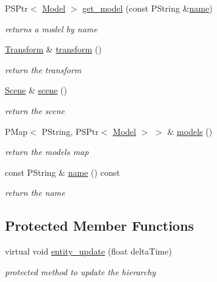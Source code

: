 \begin{DoxyCompactItemize}
P\+S\+Ptr$<$ \mbox{\hyperlink{classprz_1_1_model}{Model}} $>$ \mbox{\hyperlink{classprz_1_1_entity_a9596c8a874c25cb930360b4dacaf7188}{get\+\_\+model}} (const P\+String \&\mbox{\hyperlink{classprz_1_1_entity_a3dcb8ce07126711bf90f3272b293d980}{name}})
\begin{DoxyCompactList}\small\item\em returns a model by name \end{DoxyCompactList}\item 
\mbox{\hyperlink{classprz_1_1_transform}{Transform}} \& \mbox{\hyperlink{classprz_1_1_entity_a4ad46e0479f2aa68a0ec75c8fe3b8238}{transform}} ()
\begin{DoxyCompactList}\small\item\em return the transform \end{DoxyCompactList}\item 
\mbox{\hyperlink{classprz_1_1_scene}{Scene}} \& \mbox{\hyperlink{classprz_1_1_entity_abc93c872fbda2dff6c205a8aeac9d96e}{scene}} ()
\begin{DoxyCompactList}\small\item\em return the scene \end{DoxyCompactList}\item 
P\+Map$<$ P\+String, P\+S\+Ptr$<$ \mbox{\hyperlink{classprz_1_1_model}{Model}} $>$ $>$ \& \mbox{\hyperlink{classprz_1_1_entity_af6c594463d2a6cb91d1e30b7d5bda397}{models}} ()
\begin{DoxyCompactList}\small\item\em return the models map \end{DoxyCompactList}\item 
const P\+String \& \mbox{\hyperlink{classprz_1_1_entity_a3dcb8ce07126711bf90f3272b293d980}{name}} () const
\begin{DoxyCompactList}\small\item\em return the name \end{DoxyCompactList}\end{DoxyCompactItemize}
\subsection*{Protected Member Functions}
\begin{DoxyCompactItemize}
\item 
virtual void \mbox{\hyperlink{classprz_1_1_entity_abf4cb73b801b239f61535eec0505b26d}{entity\+\_\+update}} (float delta\+Time)
\begin{DoxyCompactList}\small\item\em protected method to update the hierarchy \end{DoxyCompactList}\end{DoxyCompactItemize}
